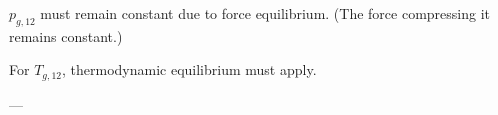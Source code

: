 \( p_{g,12} \) must remain constant due to force equilibrium.  
(The force compressing it remains constant.)  

For \( T_{g,12} \), thermodynamic equilibrium must apply.  

---